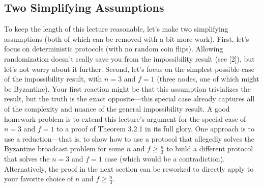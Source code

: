 \subsection{Two Simplifying Assumptions}
To keep the length of this lecture reasonable, let’s make two simplifying assumptions (both
of which can be removed with a bit more work). First, let’s focus on deterministic protocols (with no random coin flips). Allowing randomization doesn't really save you from the impossibility result (see [2]), but let’s not worry about it further. Second, let’s focus on the
simplest-possible case of the impossibility result, with $n = 3$ and $f = 1$ (three nodes, one
of which might be Byzantine). Your first reaction might be that this assumption trivializes
the result, but the truth is the exact opposite—this special case already captures all of the
complexity and nuance of the general impossibility result. A good homework problem is
to extend this lecture’s argument for the special case of $n = 3$ and $f = 1$ to a proof of
Theorem 3.2.1 in its full glory. One approach is to use a reduction—that is, to show how
to use a protocol that allegedly solves the Byzantine broadcast problem for some $n$ and
$f \geq \frac{n}{3}$ to build a different protocol that solves the $n = 3$ and $f = 1$ case (which would
be a contradiction). Alternatively, the proof in the next section can be reworked to directly
apply to your favorite choice of $n$ and $f \geq \frac{n}{3}$.


